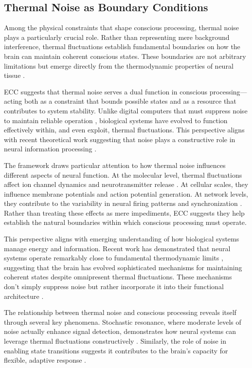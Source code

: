 \begin{refsection}
\section{Thermal Noise as Boundary Conditions}

Among the physical constraints that shape conscious processing, thermal noise plays a particularly crucial role. Rather than representing mere background interference, thermal fluctuations establish fundamental boundaries on how the brain can maintain coherent conscious states. These boundaries are not arbitrary limitations but emerge directly from the thermodynamic properties of neural tissue \cite{faisal2008}.

ECC suggests that thermal noise serves a dual function in conscious processing—acting both as a constraint that bounds possible states and as a resource that contributes to system stability. Unlike digital computers that must suppress noise to maintain reliable operation \cite{vanderziel1988}, biological systems have evolved to function effectively within, and even exploit, thermal fluctuations. This perspective aligns with recent theoretical work suggesting that noise plays a constructive role in neural information processing \cite{mcdonnell2011}.

The framework draws particular attention to how thermal noise influences different aspects of neural function. At the molecular level, thermal fluctuations affect ion channel dynamics and neurotransmitter release \cite{attwell2001}. At cellular scales, they influence membrane potentials and action potential generation. At network levels, they contribute to the variability in neural firing patterns and synchronization \cite{schreiber2003}. Rather than treating these effects as mere impediments, ECC suggests they help establish the natural boundaries within which conscious processing must operate.

This perspective aligns with emerging understanding of how biological systems manage energy and information. Recent work has demonstrated that neural systems operate remarkably close to fundamental thermodynamic limits \cite{laughlin2001}, suggesting that the brain has evolved sophisticated mechanisms for maintaining coherent states despite omnipresent thermal fluctuations. These mechanisms don't simply suppress noise but rather incorporate it into their functional architecture \cite{harris2012}.

The relationship between thermal noise and conscious processing reveals itself through several key phenomena. Stochastic resonance, where moderate levels of noise actually enhance signal detection, demonstrates how neural systems can leverage thermal fluctuations constructively \cite{gammaitoni1998}. Similarly, the role of noise in enabling state transitions suggests it contributes to the brain's capacity for flexible, adaptive response \cite{mcdonnell2009}.


\end{refsection}

